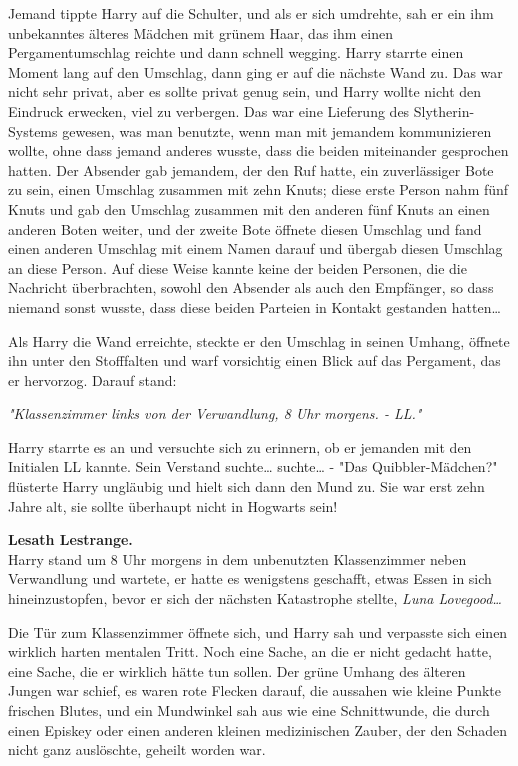 {Jemand tippte Harry auf die Schulter, und als er sich umdrehte, sah er ein ihm unbekanntes älteres Mädchen mit grünem Haar, das ihm einen Pergamentumschlag reichte und dann schnell wegging. Harry starrte einen Moment lang auf den Umschlag, dann ging er auf die nächste Wand zu. Das war nicht sehr privat, aber es sollte privat genug sein, und Harry wollte nicht den Eindruck erwecken, viel zu verbergen. Das war eine Lieferung des Slytherin-Systems gewesen, was man benutzte, wenn man mit jemandem kommunizieren wollte, ohne dass jemand anderes wusste, dass die beiden miteinander gesprochen hatten. Der Absender gab jemandem, der den Ruf hatte, ein zuverlässiger Bote zu sein, einen Umschlag zusammen mit zehn Knuts; diese erste Person nahm fünf Knuts und gab den Umschlag zusammen mit den anderen fünf Knuts an einen anderen Boten weiter, und der zweite Bote öffnete diesen Umschlag und fand einen anderen Umschlag mit einem Namen darauf und übergab diesen Umschlag an diese Person. Auf diese Weise kannte keine der beiden Personen, die die Nachricht überbrachten, sowohl den Absender als auch den Empfänger, so dass niemand sonst wusste, dass diese beiden Parteien in Kontakt gestanden hatten…

Als Harry die Wand erreichte, steckte er den Umschlag in seinen Umhang, öffnete ihn unter den Stofffalten und warf vorsichtig einen Blick auf das Pergament, das er hervorzog. Darauf stand:

\emph{"Klassenzimmer links von der Verwandlung, 8 Uhr morgens. - LL."}

Harry starrte es an und versuchte sich zu erinnern, ob er jemanden mit den Initialen LL kannte. Sein Verstand suchte… suchte… - "Das Quibbler-Mädchen?" flüsterte Harry ungläubig und hielt sich dann den Mund zu. Sie war erst zehn Jahre alt, sie sollte überhaupt nicht in Hogwarts sein!

\textbf{Lesath Lestrange.}\\ Harry stand um 8 Uhr morgens in dem unbenutzten Klassenzimmer neben Verwandlung und wartete, er hatte es wenigstens geschafft, etwas Essen in sich hineinzustopfen, bevor er sich der nächsten Katastrophe stellte, \emph{Luna Lovegood…}

Die Tür zum Klassenzimmer öffnete sich, und Harry sah und verpasste sich einen wirklich harten mentalen Tritt. Noch eine Sache, an die er nicht gedacht hatte, eine Sache, die er wirklich hätte tun sollen. Der grüne Umhang des älteren Jungen war schief, es waren rote Flecken darauf, die aussahen wie kleine Punkte frischen Blutes, und ein Mundwinkel sah aus wie eine Schnittwunde, die durch einen Episkey oder einen anderen kleinen medizinischen Zauber, der den Schaden nicht ganz auslöschte, geheilt worden war.

}

